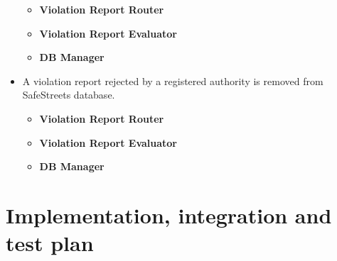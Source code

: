 \documentclass{article}
\newcommand\requirement[1]{\item[{[R#1]}] }
\begin{document}
\begin{itemize}
\begin{itemize}
				\item \textbf{Violation Report Router}
				\item \textbf{Violation Report Evaluator}
				\item \textbf{DB Manager} 
			\end{itemize}
			\requirement{22} A violation report rejected by a registered authority is removed from SafeStreets database.
			\begin{itemize}
				\item \textbf{Violation Report Router}
				\item \textbf{Violation Report Evaluator}
				\item \textbf{DB Manager}
			\end{itemize}
		\end{itemize}
			
	\clearpage	
	\section{Implementation, integration and test plan}
\end{document}

